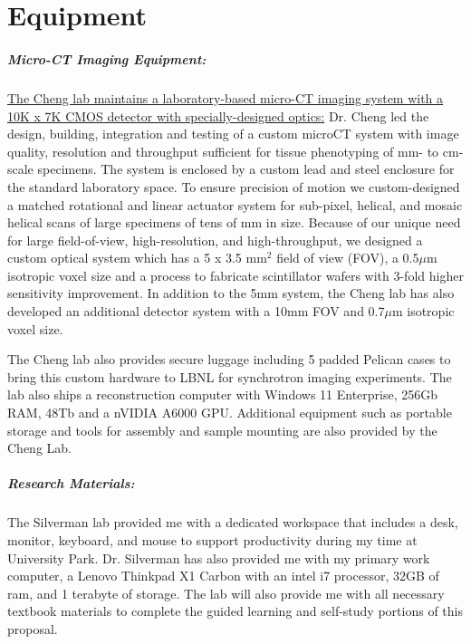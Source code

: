 \documentclass{NIHGrant}
\begin{document}
\part*{Equipment}
\subsubsection*{Micro-CT Imaging Equipment:} \uline{The Cheng lab maintains a laboratory-based micro-CT imaging system with a 10K x 7K CMOS detector with specially-designed optics:} Dr. Cheng led the design, building, integration and testing of a custom microCT system with image quality, resolution and throughput sufficient for tissue phenotyping of mm- to cm-scale specimens. The system is enclosed by a custom lead and steel enclosure for the standard laboratory space. To ensure precision of motion we custom-designed a matched rotational and linear actuator system for sub-pixel, helical, and mosaic helical scans of large specimens of tens of mm in size. Because of our unique need for large field-of-view, high-resolution, and high-throughput, we designed a custom optical system which has a 5 x 3.5 mm$^{2}$ field of view (FOV), a 0.5$\mu$m isotropic voxel size and a process to fabricate scintillator wafers with 3-fold higher sensitivity improvement. In addition to the 5mm system, the Cheng lab has also developed an additional detector system with a 10mm FOV and 0.7$\mu$m isotropic voxel size.

The Cheng lab also provides secure luggage including 5 padded Pelican cases to bring this custom hardware to LBNL for synchrotron imaging experiments. The lab also ships a reconstruction computer with Windows 11 Enterprise, 256Gb RAM, 48Tb and a nVIDIA A6000 GPU. Additional equipment such as portable storage and tools for assembly and sample mounting are also provided by the Cheng Lab.

\subsubsection*{Research Materials:} The Silverman lab provided me with a dedicated workspace that includes a desk, monitor, keyboard, and mouse to support productivity during my time at University Park. Dr. Silverman has also provided me with my primary work computer, a Lenovo Thinkpad X1 Carbon with an intel i7 processor, 32GB of ram, and 1 terabyte of storage. The lab will also provide me with all necessary textbook materials to complete the guided learning and self-study portions of this proposal.


\end{document}
